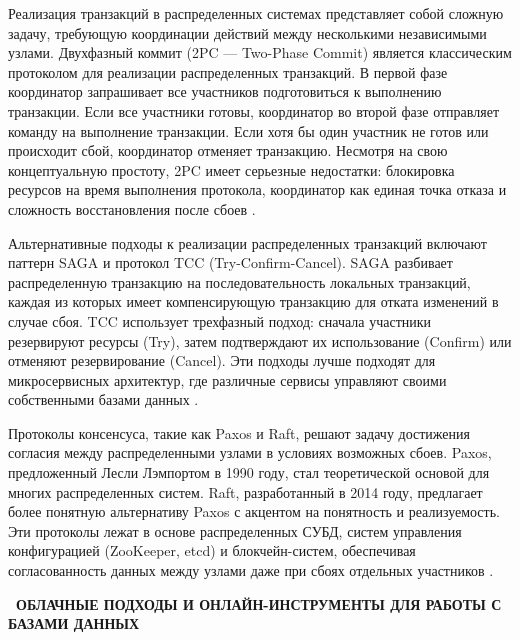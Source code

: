 \documentclass{SibFU-docs}
\begin{document}
Реализация транзакций в распределенных системах представляет собой сложную задачу, требующую координации действий между несколькими независимыми узлами. Двухфазный коммит (2PC — Two-Phase Commit) является классическим протоколом для реализации распределенных транзакций. В первой фазе координатор запрашивает все участников подготовиться к выполнению транзакции. Если все участники готовы, координатор во второй фазе отправляет команду на выполнение транзакции. Если хотя бы один участник не готов или происходит сбой, координатор отменяет транзакцию. Несмотря на свою концептуальную простоту, 2PC имеет серьезные недостатки: блокировка ресурсов на время выполнения протокола, координатор как единая точка отказа и сложность восстановления после сбоев \cite{gray1993}.

Альтернативные подходы к реализации распределенных транзакций включают паттерн SAGA и протокол TCC (Try-Confirm-Cancel). SAGA разбивает распределенную транзакцию на последовательность локальных транзакций, каждая из которых имеет компенсирующую транзакцию для отката изменений в случае сбоя. TCC использует трехфазный подход: сначала участники резервируют ресурсы (Try), затем подтверждают их использование (Confirm) или отменяют резервирование (Cancel). Эти подходы лучше подходят для микросервисных архитектур, где различные сервисы управляют своими собственными базами данных \cite{gray1993}.

Протоколы консенсуса, такие как Paxos и Raft, решают задачу достижения согласия между распределенными узлами в условиях возможных сбоев. Paxos, предложенный Лесли Лэмпортом в 1990 году, стал теоретической основой для многих распределенных систем. Raft, разработанный в 2014 году, предлагает более понятную альтернативу Paxos с акцентом на понятность и реализуемость. Эти протоколы лежат в основе распределенных СУБД, систем управления конфигурацией (ZooKeeper, etcd) и блокчейн-систем, обеспечивая согласованность данных между узлами даже при сбоях отдельных участников \cite{lamport1998, ongaro2014}.

\newpage
{}
\begin{center}\textbf{\thesection\ ОБЛАЧНЫЕ ПОДХОДЫ И ОНЛАЙН-ИНСТРУМЕНТЫ ДЛЯ РАБОТЫ С БАЗАМИ ДАННЫХ}\end{center}
\vspace*{-1.5em}

\end{document}
